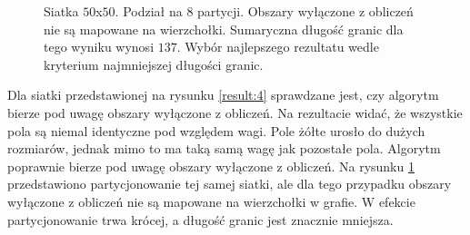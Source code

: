 \begin{figure}[h]
\begin{subfigure}{.33\textwidth}
    \caption[short]{}
\end{subfigure}
\caption{Siatka $50$x$50$. Podział na $8$ partycji. Obszary wyłączone z obliczeń nie są mapowane na wierzchołki.
Sumaryczna długość granic dla tego wyniku wynosi $137$.
Wybór najlepszego rezultatu wedle kryterium najmniejszej długości granic.}
\label{result:1}
\end{figure}

Dla siatki przedstawionej na rysunku \ref{result:4} sprawdzane jest, czy algorytm bierze pod uwagę obszary wyłączone z obliczeń.
Na rezultacie widać, że wszystkie pola są niemal identyczne pod względem wagi.
Pole żółte urosło do dużych rozmiarów, jednak mimo to ma taką samą wagę jak pozostałe pola.
Algorytm poprawnie bierze pod uwagę obszary wyłączone z obliczeń.
Na rysunku \ref{result:1} przedstawiono partycjonowanie tej samej siatki, ale dla tego przypadku obszary wyłączone
z obliczeń nie są mapowane na wierzchołki w grafie.
W efekcie partycjonowanie trwa krócej, a długość granic jest znacznie mniejsza.

